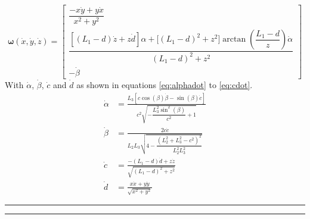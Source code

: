     \begin{equation}\label{eq:rate}
        \bm{\omega}(\dot{x}, \dot{y}, \dot{z}) =
                            \begin{bmatrix}
                                \dfrac{- x\dot{y} + y \dot{x}}{x^2 + y^2}\\[0.5cm]
                                \dfrac{\left[(L_1 - d)\dot{z} + z\dot{d}\right]\alpha + \Big[(L_1 - d)^2 + z^2\Big]\arctan{\left(\dfrac{L_1-d}{z}\right)}\dot{\alpha}}{(L_1 - d)^2 + z^2}\\[0.8cm]
                                -\dot{\beta} 
                            \end{bmatrix}
    \end{equation}
    With \(\dot\alpha\), \(\dot\beta\), \(\dot{c}\) and \(\dot{d}\) as shown in equations \ref{eq:alphadot} to \ref{eq:cdot}.
    \begin{align}
        \dot{\alpha} &= \frac{ L_3\left[ c\cos(\beta)\dot{\beta} - \sin(\beta)\dot{c} \right] }{ c^2\sqrt{-\dfrac{L_3^2\sin^2(\beta)}{c^2}+1} } \label{eq:alphadot} \\[0.5cm] 
        \dot{\beta} &= \frac{ 2c\dot{c} }{ L_2L_3\sqrt{4 - \dfrac{(L_2^2+L_3^2-c^2)^2}{L_2^2L_3^2}} } \label{eq:betadot} \\[0.5cm]
        \dot{c} &= \frac{-(L_1 - d)\dot{d} + z\dot{z}}{\sqrt{(L_1 - d)^2 + z^2}} \label{eq:bdot} \\[0.5cm]
        \dot{d} &= \frac{x\dot{x} + y\dot{y}}{\sqrt{x^2 + y^2}} \label{eq:cdot}
    \end{align}
    
    \bigskip
    \hrule
    \smallbreak
    \hrule